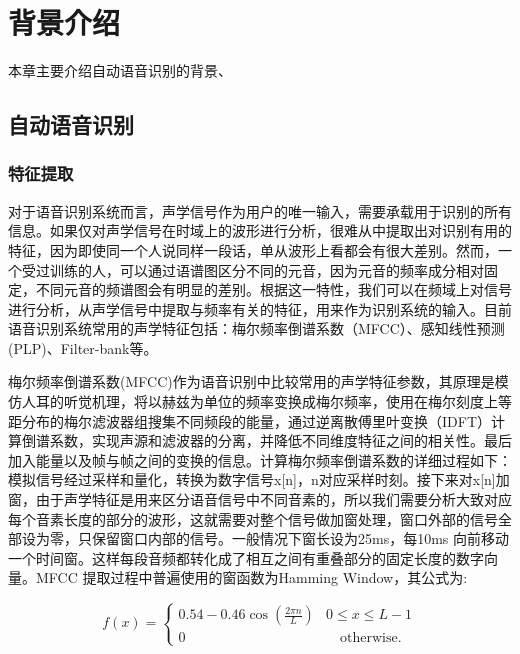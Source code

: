 ﻿%

\chapter{背景介绍}
本章主要介绍自动语音识别的背景、
\section{自动语音识别}

\subsection{特征提取}

对于语音识别系统而言，声学信号作为用户的唯一输入，需要承载用于识别的所有信息。如果仅对声学信号在时域上的波形进行分析，很难从中提取出对识别有用的特征，因为即使同一个人说同样一段话，单从波形上看都会有很大差别。然而，一个受过训练的人，可以通过语谱图区分不同的元音，因为元音的频率成分相对固定，不同元音的频谱图会有明显的差别。根据这一特性，我们可以在频域上对信号进行分析，从声学信号中提取与频率有关的特征，用来作为识别系统的输入。目前语音识别系统常用的声学特征包括：梅尔频率倒谱系数（MFCC）、感知线性预测(PLP)、Filter-bank等。


梅尔频率倒谱系数(MFCC)作为语音识别中比较常用的声学特征参数，其原理是模仿人耳的听觉机理，将以赫兹为单位的频率变换成梅尔频率，使用在梅尔刻度上等距分布的梅尔滤波器组搜集不同频段的能量，通过逆离散傅里叶变换（IDFT）计算倒谱系数，实现声源和滤波器的分离，并降低不同维度特征之间的相关性。最后加入能量以及帧与帧之间的变换的信息。计算梅尔频率倒谱系数的详细过程如下：模拟信号经过采样和量化，转换为数字信号x[n]，n对应采样时刻。接下来对x[n]加窗，由于声学特征是用来区分语音信号中不同音素的，所以我们需要分析大致对应每个音素长度的部分的波形，这就需要对整个信号做加窗处理，窗口外部的信号全部设为零，只保留窗口内部的信号。一般情况下窗长设为25ms，每10ms 向前移动一个时间窗。这样每段音频都转化成了相互之间有重叠部分的固定长度的数字向量。MFCC 提取过程中普遍使用的窗函数为Hamming Window，其公式为:

\begin{equation}
  f(x)=
    \begin{cases}
      0.54 - 0.46\cos(\frac{2{\pi}n}{L}) & 0\leq x\leq L-1 \\
      \text{0} &\quad\text{otherwise.} \
    \end{cases}
\end{equation}

